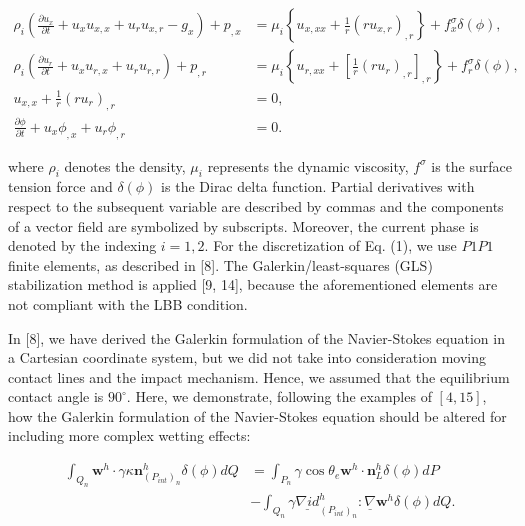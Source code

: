 \documentclass[10pt]{article}
\begin{document}
\begin{align*}
\rho_{i}\left(\frac{\partial u_{x}}{\partial t}+u_{x} u_{x, x}+u_{r} u_{x, r}-g_{x}\right)+p_{, x} & =\mu_{i}\left\{u_{x, x x}+\frac{1}{r}\left(r u_{x, r}\right)_{, r}\right\}+f_{x}^{\sigma} \delta(\phi), \\
\rho_{i}\left(\frac{\partial u_{r}}{\partial t}+u_{x} u_{r, x}+u_{r} u_{r, r}\right)+p_{, r} & =\mu_{i}\left\{u_{r, x x}+\left[\frac{1}{r}\left(r u_{r}\right)_{, r}\right]_{, r}\right\}+f_{r}^{\sigma} \delta(\phi), \\
u_{x, x}+\frac{1}{r}\left(r u_{r}\right)_{, r} & =0, \\
\frac{\partial \phi}{\partial t}+u_{x} \phi_{, x}+u_{r} \phi_{, r} & =0 . \tag{1}
\end{align*}


where $\rho_{i}$ denotes the density, $\mu_{i}$ represents the dynamic viscosity, $f^{\sigma}$ is the surface tension force and $\delta(\phi)$ is the Dirac delta function. Partial derivatives with respect to the subsequent variable are described by commas and the components of a vector field are symbolized by subscripts. Moreover, the current phase is denoted by the indexing $i=1,2$. For the discretization of Eq. (1), we use $P 1 P 1$ finite elements, as described in [8]. The Galerkin/least-squares (GLS) stabilization method is applied [9, 14], because the aforementioned elements are not compliant with the LBB condition.

In [8], we have derived the Galerkin formulation of the Navier-Stokes equation in a Cartesian coordinate system, but we did not take into consideration moving contact lines and the impact mechanism. Hence, we assumed that the equilibrium contact angle is $90^{\circ}$. Here, we demonstrate, following the examples of $[4,15]$, how the Galerkin formulation of the Navier-Stokes equation should be altered for including more complex wetting effects:


\begin{align*}
\int_{Q_{n}} \mathbf{w}^{h} \cdot \gamma \kappa \mathbf{n}_{\left(P_{i n t}\right)_{n}}^{h} \delta(\phi) d Q & =\int_{P_{n}} \gamma \cos \theta_{e} \mathbf{w}^{h} \cdot \mathbf{n}_{L}^{h} \delta(\phi) d P  \tag{2}\\
& -\int_{Q_{n}} \gamma \underline{\nabla i d}_{\left(P_{i n t}\right)_{n}}^{h}: \underline{\nabla} \mathbf{w}^{h} \delta(\phi) d Q .
\end{align*}
\end{document}
